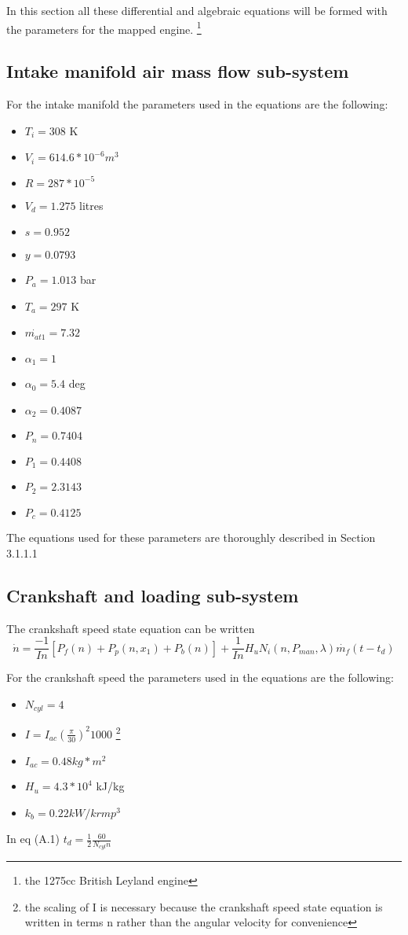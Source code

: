 \begin{appendices}
In this section all these differential and algebraic equations will be formed with the parameters for the mapped engine. \footnote{the 1275cc British Leyland engine}

\subsection*{Intake manifold air mass flow sub-system}

For the intake manifold the parameters used in the equations are the following:

\begin{itemize}
	\item $T_{i}=308$ K 
	\item $V_{i}=614.6*10^{-6} m^3$
	\item $R=287*10^{-5}$
	\item $V_{d}=1.275$ litres
	\item $s=0.952$
	\item $y=0.0793$
	\item $P_{a}=1.013$ bar
	\item $T_{a}=297$ K
	\item $\dot{m_{at1}}=7.32$
	\item $\alpha _{1}=1$ 
	\item $\alpha _{0}= 5.4$ deg
	\item $\alpha _{2}=0.4087$
	\item $P_{n}=0.7404$
	\item $P_{1}=0.4408$
	\item $P_{2}=2.3143$
	\item $P_{c}=0.4125$
\end{itemize}
The equations used for these parameters are thoroughly described in Section 3.1.1.1

\subsection*{Crankshaft and loading sub-system}

The crankshaft speed state equation can be written
\begin{equation}
\dot{n}=\frac{-1}{In}[P_{f}(n)+P_{p}(n,x_{1})+P_{b}(n)]+\frac{1}{In}H_{u}N_{i}(n,P_{man},\lambda)\dot{m_{f}}(t-t_{d})
\end{equation}

\renewcommand{\thefootnote}{\fnsymbol{footnote}}

For the crankshaft speed the parameters used in the equations are the following:
\begin{itemize}
	\item $N_{cyl}=4$
	\item $I=I_{ac}(\frac{\pi}{30})^2 1000$ \footnote{the scaling of I is necessary because the crankshaft speed state equation is written in terms n rather than the angular velocity for convenience}
	\item $I_{ac}=0.48 kg*m^2$
	\item $H_{u}=4.3*10^4$ kJ/kg
	\item $k_{b}=0.22 kW/krmp^3$
\end{itemize}
In eq (A.1) $t_{d}=\displaystyle\frac{1}{2} \displaystyle\frac{60}{N_{cyl}n}$
\\


\end{appendices}
